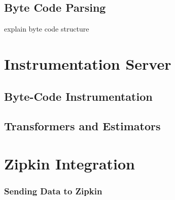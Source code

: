 \subsection{Byte Code Parsing}
explain byte code structure

\section{Instrumentation Server}
\subsection{Byte-Code Instrumentation}
\subsection{Transformers and Estimators}
\section{Zipkin Integration}
\subsubsection{Sending Data to Zipkin}
